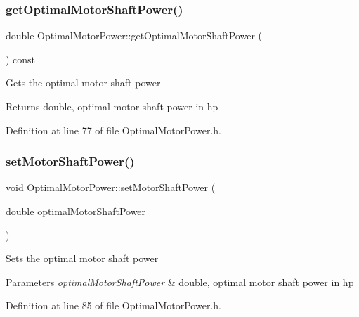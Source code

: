 \subsubsection{\texorpdfstring{get\+Optimal\+Motor\+Shaft\+Power()}{getOptimalMotorShaftPower()}\hspace{0.1cm}{\footnotesize\ttfamily [3/3]}}
{\footnotesize\ttfamily double Optimal\+Motor\+Power\+::get\+Optimal\+Motor\+Shaft\+Power (\begin{DoxyParamCaption}{ }\end{DoxyParamCaption}) const\hspace{0.3cm}{\ttfamily [inline]}}

Gets the optimal motor shaft power \begin{DoxyReturn}{Returns}
double, optimal motor shaft power in hp 
\end{DoxyReturn}


Definition at line 77 of file Optimal\+Motor\+Power.\+h.

\mbox{\label{class_optimal_motor_power_ada8a9e3caac34c54470ad13ffe7edf53}} 
\subsubsection{\texorpdfstring{set\+Motor\+Shaft\+Power()}{setMotorShaftPower()}\hspace{0.1cm}{\footnotesize\ttfamily [1/3]}}
{\footnotesize\ttfamily void Optimal\+Motor\+Power\+::set\+Motor\+Shaft\+Power (\begin{DoxyParamCaption}\item[{double}]{optimal\+Motor\+Shaft\+Power }\end{DoxyParamCaption})\hspace{0.3cm}{\ttfamily [inline]}}

Sets the optimal motor shaft power 
\begin{DoxyParams}{Parameters}
{\em optimal\+Motor\+Shaft\+Power} & double, optimal motor shaft power in hp \\
\hline
\end{DoxyParams}


Definition at line 85 of file Optimal\+Motor\+Power.\+h.

\mbox{\label{class_optimal_motor_power_ada8a9e3caac34c54470ad13ffe7edf53}} 
